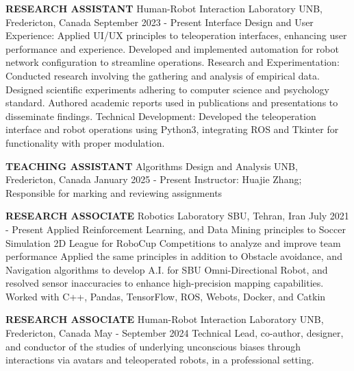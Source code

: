 
\begin{cventries}
    \cventry
    {\textbf{RESEARCH ASSISTANT}}
    {Human-Robot Interaction Laboratory}
    {UNB, Fredericton, Canada}
    {September 2023 - Present}
    {Interface Design and User Experience: Applied UI/UX principles to teleoperation interfaces, enhancing user performance and experience. Developed and implemented automation for robot network configuration to streamline operations.
    \newline Research and Experimentation: Conducted research involving the gathering and analysis of empirical data. Designed scientific experiments adhering to computer science and psychology standard. Authored academic reports used in publications and presentations to disseminate findings.
    \newline Technical Development: Developed the teleoperation interface and robot operations using Python3, integrating ROS and Tkinter for functionality with proper modulation.
    }
    \vspace{0.4 cm}
\end{cventries}

\begin{cventries}
    \cventry
    {\textbf{TEACHING ASSISTANT}}
    {Algorithms Design and Analysis}
    {UNB, Fredericton, Canada}
    {January 2025 - Present}
    {Instructor: Huajie Zhang; Responsible for marking and reviewing assignments}
    \vspace{0.4 cm}
\end{cventries}


\begin{cventries}
    \cventry
    {\textbf {RESEARCH ASSOCIATE}}
    {Robotics Laboratory}
    {SBU, Tehran, Iran}
    {July 2021 - Present}
    {Applied Reinforcement Learning, and Data Mining principles to Soccer Simulation 2D League for RoboCup Competitions to analyze and improve team performance 
    \newline Applied the same principles in addition to Obstacle avoidance, and Navigation algorithms to develop A.I. for SBU Omni-Directional Robot, 
    and resolved sensor inaccuracies to enhance high-precision mapping capabilities.
    \newline Worked with C++, Pandas, TensorFlow, ROS, Webots, Docker, and Catkin}
    \vspace{0.4 cm}
\end{cventries}

\begin{cventries}
    \cventry
    {\textbf{RESEARCH ASSOCIATE}}
    {Human-Robot Interaction Laboratory}
    {UNB, Fredericton, Canada}
    {May - September 2024}
    {Technical Lead, co-author, designer, and conductor of the studies of underlying unconscious biases through interactions via avatars and teleoperated robots, in a professional setting.
    }
    \vspace{0.4 cm}
\end{cventries}

